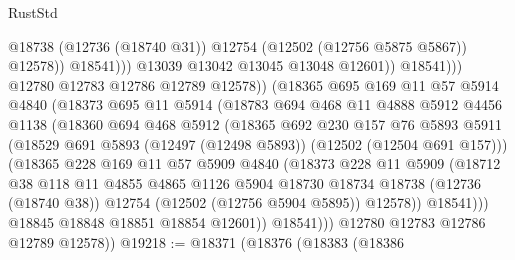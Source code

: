 \begin{lexlean}{RustStd}
\begin{coremodule}
                                    @18738
                                    (@12736 (@18740 @31))
                                    @12754
                                    (@12502 (@12756 @5875 @5867))
                                    @12578))
                                @18541)))
                          @13039
                          @13042
                          @13045
                          @13048
                          @12601))
                      @18541)))
                @12780
                @12783
                @12786
                @12789
                @12578))
            (@18365
              @695
              @169
              @11
              @57
              @5914
              @4840
              (@18373
                @695
                @11
                @5914
                (@18783
                  @694
                  @468
                  @11
                  @4888
                  @5912
                  @4456
                  @1138
                  (@18360
                    @694
                    @468
                    @5912
                    (@18365
                      @692
                      @230
                      @157
                      @76
                      @5893
                      @5911
                      (@18529 @691 @5893 (@12497 (@12498 @5893)) (@12502 (@12504 @691 @157)))
                      (@18365
                        @228
                        @169
                        @11
                        @57
                        @5909
                        @4840
                        (@18373
                          @228
                          @11
                          @5909
                          (@18712
                            @38
                            @118
                            @11
                            @4855
                            @4865
                            @1126
                            @5904
                            @18730
                            @18734
                            @18738
                            (@12736 (@18740 @38))
                            @12754
                            (@12502 (@12756 @5904 @5895))
                            @12578))
                        @18541)))
                  @18845
                  @18848
                  @18851
                  @18854
                  @12601))
              @18541)))
        @12780
        @12783
        @12786
        @12789
        @12578))
@19218 := @18371
    (@18376
      (@18383
        (@18386

\end{coremodule}
\end{lexlean}

